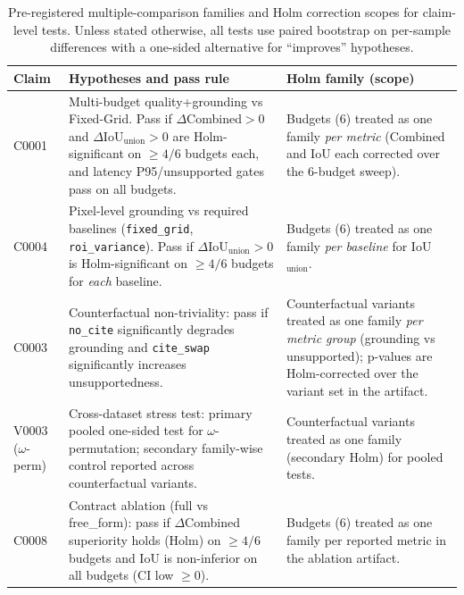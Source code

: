 \begin{table}[t]
  \caption{Pre-registered multiple-comparison families and Holm correction scopes for claim-level tests. Unless stated otherwise, all tests use paired bootstrap on per-sample differences with a one-sided alternative for ``improves'' hypotheses.}
  \label{tab:stats-family}
  \centering
  \small
  \setlength{\tabcolsep}{4pt}
  \begin{tabularx}{\textwidth}{l X X}
    \toprule
    Claim & Hypotheses and pass rule & Holm family (scope) \\
    \midrule
    C0001 & Multi-budget quality+grounding vs Fixed-Grid. Pass if $\Delta$Combined$>0$ and $\Delta$IoU$_{\mathrm{union}}>0$ are Holm-significant on $\geq 4/6$ budgets each, and latency P95/unsupported gates pass on all budgets. & Budgets (6) treated as one family \emph{per metric} (Combined and IoU each corrected over the 6-budget sweep). \\
    C0004 & Pixel-level grounding vs required baselines (\texttt{fixed\_grid}, \texttt{roi\_variance}). Pass if $\Delta$IoU$_{\mathrm{union}}>0$ is Holm-significant on $\geq 4/6$ budgets for \emph{each} baseline. & Budgets (6) treated as one family \emph{per baseline} for IoU$_{\mathrm{union}}$. \\
    C0003 & Counterfactual non-triviality: pass if \texttt{no\_cite} significantly degrades grounding and \texttt{cite\_swap} significantly increases unsupportedness. & Counterfactual variants treated as one family \emph{per metric group} (grounding vs unsupported); p-values are Holm-corrected over the variant set in the artifact. \\
    V0003 ($\omega$-perm) & Cross-dataset stress test: primary pooled one-sided test for $\omega$-permutation; secondary family-wise control reported across counterfactual variants. & Counterfactual variants treated as one family (secondary Holm) for pooled tests. \\
    C0008 & Contract ablation (full vs free\_form): pass if $\Delta$Combined superiority holds (Holm) on $\geq 4/6$ budgets and IoU is non-inferior on all budgets (CI low $\geq 0$). & Budgets (6) treated as one family per reported metric in the ablation artifact. \\
    \bottomrule
  \end{tabularx}
\end{table}

